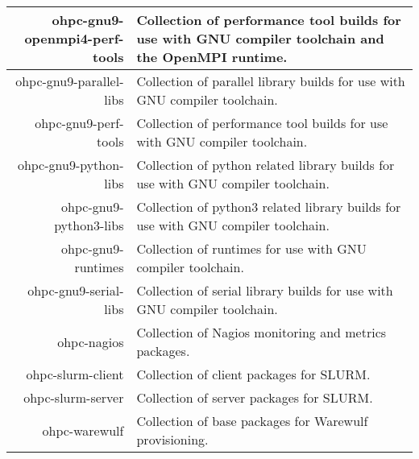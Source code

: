 \begin{tabularx}{\textwidth}{r|X}
\hline
ohpc-gnu9-openmpi4-perf-tools & Collection of performance tool builds for use with GNU compiler toolchain and the OpenMPI runtime. \\ 
\hline
ohpc-gnu9-parallel-libs & Collection of parallel library builds for use with GNU compiler toolchain. \\ 
\hline
ohpc-gnu9-perf-tools & Collection of performance tool builds for use with GNU compiler toolchain. \\ 
\hline
ohpc-gnu9-python-libs & Collection of python related library builds for use with GNU compiler toolchain. \\ 
\hline
ohpc-gnu9-python3-libs & Collection of python3 related library builds for use with GNU compiler toolchain. \\ 
\hline
ohpc-gnu9-runtimes & Collection of runtimes for use with GNU compiler toolchain. \\ 
\hline
ohpc-gnu9-serial-libs & Collection of serial library builds for use with GNU compiler toolchain. \\ 
\hline
ohpc-nagios & Collection of Nagios monitoring and metrics packages. \\ 
\hline
ohpc-slurm-client & Collection of client packages for SLURM. \\ 
\hline
ohpc-slurm-server & Collection of server packages for SLURM. \\ 
\hline
ohpc-warewulf & Collection of base packages for Warewulf provisioning. \\ 
\hline
\bottomrule
\end{tabularx}
